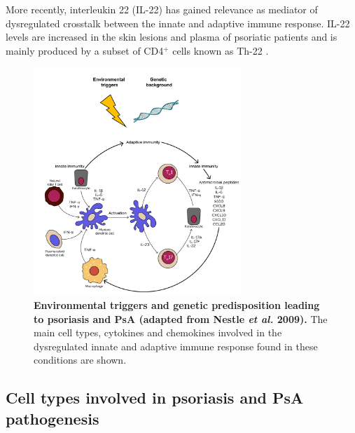 More recently, interleukin 22 (IL-22) has gained relevance as mediator of dysregulated crosstalk between the innate and adaptive immune response. IL-22 levels are increased in the skin lesions and plasma of psoriatic patients and is mainly produced by a subset of CD4$^+$ cells known as Th-22 \parencite{Wolk2006}. %


\begin{figure}[htb]
\centering
\includegraphics[width=0.7\textwidth]{./Introduction/pdfs/PSO_adaptive_innate_immune_system_crosstalk_new}
\caption[Environmental triggers and genetic predisposition leading to psoriasis and PsA (adapted from Nestle \textit{et al.} 2009).]{\textbf{Environmental triggers and genetic predisposition leading to psoriasis and PsA (adapted from Nestle \textit{et al.} 2009).} The main cell types, cytokines and chemokines involved in the dysregulated innate and adaptive immune response found in these conditions are shown.}
\label{fig:PSO_immune_system_diagram}
\end{figure}

\subsection{Cell types involved in psoriasis and PsA pathogenesis}

